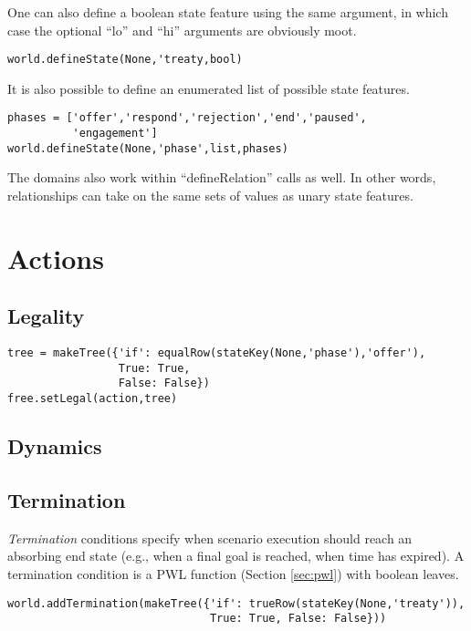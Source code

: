 \documentclass{book}
\begin{document}
One can also define a boolean state feature using the same argument, in which case the optional ``lo'' and ``hi'' arguments are obviously moot.

\begin{verbatim}
world.defineState(None,'treaty,bool)
\end{verbatim}

It is also possible to define an enumerated list of possible state features.

\begin{verbatim}
phases = ['offer','respond','rejection','end','paused',
          'engagement']
world.defineState(None,'phase',list,phases)
\end{verbatim}

The domains also work within ``defineRelation'' calls as well. In other words, relationships can take on the same sets of values as unary state features.
\section{Actions}

\subsection{Legality}

\begin{verbatim}
tree = makeTree({'if': equalRow(stateKey(None,'phase'),'offer'),
                 True: True,    
                 False: False})
free.setLegal(action,tree)
\end{verbatim}

\subsection{Dynamics}

\subsection{Termination}

{\em Termination} conditions specify when scenario execution should reach an absorbing end state (e.g., when a final goal is reached, when time has expired). A termination condition is a PWL function (Section \ref{sec:pwl}) with boolean leaves.

\begin{verbatim}
world.addTermination(makeTree({'if': trueRow(stateKey(None,'treaty')),
                               True: True, False: False}))
\end{verbatim}
\end{document}
